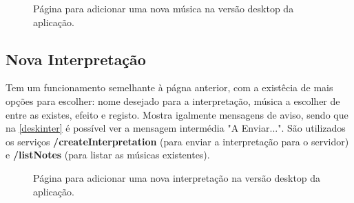 \begin{figure}[htp]
\centering
{}
\caption{Página para adicionar uma nova música na versão desktop da aplicação.}
\label{desknova}
\end{figure}

\subsection{Nova Interpretação}
Tem um funcionamento semelhante à págna anterior, com a existêcia de mais opções para escolher: nome desejado para a interpretação, música a escolher de entre as existes, efeito e registo. Mostra igalmente mensagens de aviso, sendo que na \autoref{deskinter} é possível ver a mensagem intermédia "A Enviar...". São utilizados os serviços \textbf{/createInterpretation} (para enviar a interpretação para o servidor) e \textbf{/listNotes} (para listar as músicas existentes).

\begin{figure}[htp]
\centering
{}
\caption{Página para adicionar uma nova interpretação na versão desktop da aplicação.}
\label{deskinter}
\end{figure}

